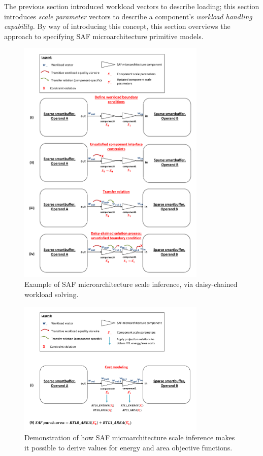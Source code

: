 The previous section introduced workload vectors to describe loading; this section introduces \textit{scale parameter} vectors to describe a component's \textit{workload handling capability.} By way of introducing this concept, this section overviews the approach to specifying SAF microarchitecture primitive models.

\clearpage

\begin{figure}[H]
    \centering
    \includegraphics[width=0.8\textwidth]{figures/workload_example.pdf}
    \caption{Example of SAF microarchitecture scale inference, via daisy-chained workload solving.}
    \label{fig:workload_example}
\end{figure}

\clearpage

\begin{figure}[H]
    \centering
    \includegraphics[width=0.8\textwidth]{figures/rtl_objective.pdf}
    \caption{Demonstration of how SAF microarchitecture scale inference makes it possible to derive values for energy and area objective functions.}
    \label{fig:rtl_objective}
\end{figure}

